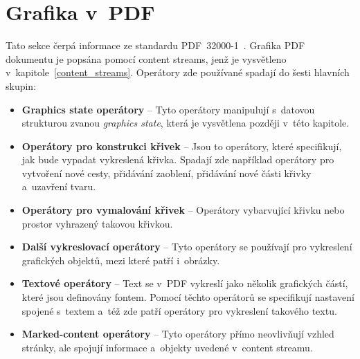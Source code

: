 \section{Grafika v~PDF}
Tato sekce čerpá informace ze standardu PDF~32000-1~\cite{PDF32000-1:2008}.
Grafika PDF dokumentu je popsána pomocí content streams, jenž je vysvětleno
v~kapitole~\ref{content_streams}. Operátory zde používané spadají do šesti
hlavních skupin:
\begin{itemize}
    \item \textbf{Graphics state operátory} -- Tyto operátory manipulují
    s~datovou strukturou zvanou \emph{graphics state}, která je vysvětlena později
    v~této kapitole.
    \item \textbf{Operátory pro konstrukci křivek} -- Jsou to operátory, které
    specifikují, jak bude vypadat vykreslená křivka. Spadají zde například
    operátory pro vytvoření nové cesty, přidávání zaoblení, přidávání nové části
    křivky a~uzavření tvaru.
    \item \textbf{Operátory pro vymalování křivek} -- Operátory vybarvující
    křivku nebo prostor vyhrazený takovou křivkou.
    \item \textbf{Další vykreslovací operátory} -- Tyto operátory se používají
    pro vykreslení grafických objektů, mezi které patří i~obrázky.
    \item \textbf{Textové operátory} -- Text se v~PDF vykreslí jako několik
    grafických částí, které jsou definovány fontem. Pomocí těchto operátorů
    se specifikují nastavení spojené s~textem a~též zde patří operátory pro
    vykreslení takového textu. 
    \item \textbf{Marked-content operátory} -- Tyto operátory přímo neovlivňují
    vzhled stránky, ale spojují informace a~objekty uvedené v~content streamu.
\end{itemize}


